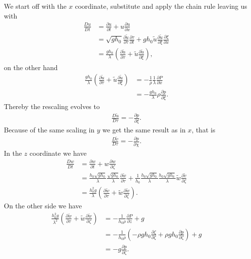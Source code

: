 We start off with the $x$ coordinate, substitute and apply the chain rule
leaving us with
\begin{align}
    \frac{Du}{Dt}
    &= \frac{\partial u}{\partial t} +u \frac{\partial
    u}{\partial x} \\
    &= \sqrt{gh_{0}}\frac{\partial \tilde{u}}{\partial \tau} \frac{\partial
    \tau}{\partial t} +gh_0 \tilde{u} \frac{\partial \tilde{u}}{\partial \xi}
    \frac{\partial \xi}{\partial x} \\
    &= \frac{gh_0}{\lambda} \left( \frac{\partial \tilde{u}}{\partial \tau}
    + \tilde{u} \frac{\partial \tilde{u}}{\partial \xi} \right),
\end{align}
on the other hand
\begin{align}
    \frac{gh_0}{\lambda} \left( \frac{\partial \tilde{u}}{\partial \tau}
    +\tilde{u} \frac{\partial \tilde{u}}{\partial \xi} \right)
    &=-\frac{1}{\rho}\frac{1}{\lambda}\frac{\partial P}{\partial x} \\
    &=-\frac{ g h_0 }{\lambda}\rho \frac{\partial p}{\partial \xi}.
\end{align}
Thereby the rescaling evolves to
\begin{align}
    \frac{D \tilde{u}}{D\tau} = -\frac{\partial p}{\partial \xi}.
\end{align}
Because of the same scaling in $y$ we get the same result as in $x$, that is
\begin{align}
    \frac{D \tilde{v}}{D\tau} = -\frac{\partial p}{\partial \chi}.
\end{align}
In the $z$ coordinate we have
\begin{align}
    \frac{Dw}{Dt}
    &= \frac{\partial w}{\partial t} +w \frac{\partial
    w}{\partial \zeta} \\
    &= \frac{h_0\sqrt{gh_0}}{\lambda} \frac{\sqrt{gh_0}}{\lambda}
    \frac{\partial \tilde{w}}{\partial \tau}  + \frac{1}{h_0}
    \frac{h_0\sqrt{gh_0} }{\lambda} \frac{h_0\sqrt{gh_0}}{\lambda}
    \tilde{w}\frac{\partial \tilde{v}}{\partial \zeta}\\
    &= \frac{h_0^2g}{\lambda}\left( \frac{\partial \tilde{w}}{\partial \tau}
    + \tilde{w}\frac{\partial \tilde{w}}{\partial \zeta} \right) .
\end{align}
On the other side we have
\begin{align}
    \frac{h_0^2g}{\lambda^2}\left( \frac{\partial \tilde{w}}{\partial \tau}
    + \tilde{w}\frac{\partial \tilde{w}}{\partial \zeta} \right)
    &=
    -\frac{1}{h_0\rho} \frac{\partial P}{\partial z} +g \\
    &=-\frac{1}{h_0\rho}\left(-\rho gh_0 \frac{\partial \zeta}{\partial
        \zeta} + \rho gh_0
    \frac{\partial p}{\partial \zeta} \right) + g  \\
    &= -g \frac{\partial p}{\partial \zeta}.
\end{align}
